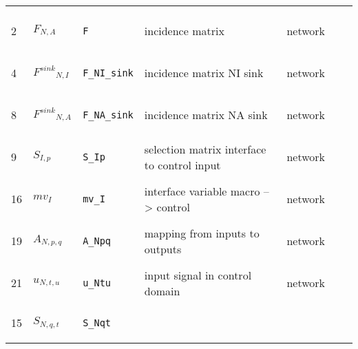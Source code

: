\begin{longtable}{|p{1cm}|p{2.5cm}|p{4.5cm}|p{8cm}|p{3.0cm}|p{3cm}|p{1cm}|}
             & \\
            2
             & \hypertarget{"v:2"}{ $ {{F}}{_{N, A}} $}
             & \verb|F|
             & incidence matrix
             & \begin{lay}network \end{lay}
             & $  $
             & \\
            4
             & \hypertarget{"v:4"}{ $ {{F^{sink}}}{_{N, I}} $}
             & \verb|F_NI_sink|
             & incidence matrix NI sink
             & \begin{lay}network \end{lay}
             & $  $
             & \\
            8
             & \hypertarget{"v:8"}{ $ {{F^{sink}}}{_{N, A}} $}
             & \verb|F_NA_sink|
             & incidence matrix NA sink
             & \begin{lay}network \end{lay}
             & $  $
             & \\
            9
             & \hypertarget{"v:9"}{ $ {{S}}{_{I, p}} $}
             & \verb|S_Ip|
             & selection matrix interface to control input
             & \begin{lay}network \end{lay}
             & $  $
             & \\
            16
             & \hypertarget{"v:16"}{ $ {{mv}}{_{I}} $}
             & \verb|mv_I|
             & interface variable macro --> control
             & \begin{lay}network \end{lay}
             & $  $
             & \\
            19
             & \hypertarget{"v:19"}{ $ {{A}}{_{N, p, q}} $}
             & \verb|A_Npq|
             & mapping from inputs to outputs
             & \begin{lay}network \end{lay}
             & $  $
             & \\
            21
             & \hypertarget{"v:21"}{ $ {{u}}{_{N, t, u}} $}
             & \verb|u_Ntu|
             & input signal in control domain
             & \begin{lay}network \end{lay}
             & $  $
             & \\
            15
             & \hypertarget{"v:15"}{ $ {{S}}{_{N, q, t}} $}
             & \verb|S_Nqt|

\end{longtable}
